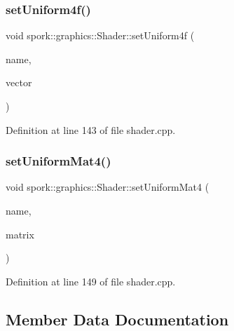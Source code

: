 \subsubsection{\texorpdfstring{set\+Uniform4f()}{setUniform4f()}}
{\footnotesize\ttfamily void spork\+::graphics\+::\+Shader\+::set\+Uniform4f (\begin{DoxyParamCaption}\item[{const G\+Lchar $\ast$}]{name,  }\item[{const \hyperlink{structspork_1_1maths_1_1vec4}{maths\+::vec4} \&}]{vector }\end{DoxyParamCaption})}



Definition at line 143 of file shader.\+cpp.

\mbox{\label{classspork_1_1graphics_1_1_shader_aad96559174940fa57823854c8fb37e7a}} 
\subsubsection{\texorpdfstring{set\+Uniform\+Mat4()}{setUniformMat4()}}
{\footnotesize\ttfamily void spork\+::graphics\+::\+Shader\+::set\+Uniform\+Mat4 (\begin{DoxyParamCaption}\item[{const G\+Lchar $\ast$}]{name,  }\item[{const \hyperlink{structspork_1_1maths_1_1mat4}{mat4} \&}]{matrix }\end{DoxyParamCaption})}



Definition at line 149 of file shader.\+cpp.



\subsection{Member Data Documentation}
\mbox{\label{classspork_1_1graphics_1_1_shader_a87cbddb4557834f2d21023d12f3a85e7}} 

